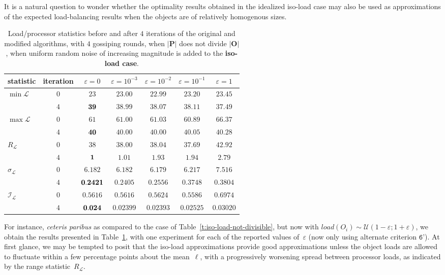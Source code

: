 It is a natural question to wonder whether the optimality results
obtained in the idealized iso-load case may also be used as
approximations of the expected load-balancing results when the objects
are of relatively homogenous sizes.

\begin{table}[htb!]
\begin{center}
\begin{tabular}{lcccccc}
\hline
statistic & iteration
& $\varepsilon=0$
& $\varepsilon=10^{-3}$
& $\varepsilon=10^{-2}$
& $\varepsilon=10^{-1}$
& $\varepsilon=1$ \\
\hline\hline
\multirow{2}{*}{$\min{\mathcal{L}}$}
&$0$ &$23$    &$23.00$ &$22.99$ &$23.20$ &$23.45$ \\
&$4$ &$\bf39$ &$38.99$ &$38.07$ &$38.11$ &$37.49$ \\\hline
\multirow{2}{*}{$\max{\mathcal{L}}$}
&$0$ &$61$    &$61.00$ &$61.03$ &$60.89$ &$66.37$ \\
&$4$ &$\bf40$ &$40.00$ &$40.00$ &$40.05$ &$40.28$ \\\hline
\multirow{2}{*}{$R_{\mathcal{L}}$}
&$0$ &$38$    &$38.00$ &$38.04$ &$37.69$ &$42.92$ \\
&$4$ &$\bf1$  &$1.01$  &$1.93$  &$1.94$  &$2.79$  \\\hline
\multirow{2}{*}{$\sigma_{\mathcal{L}}$}
&$0$ &$6.182$     &$6.182$  &$6.179$  &$6.217$ &$7.516$ \\
&$4$ &$\bf0.2421$ &$0.2405$ &$0.2556$ &$0.3748$ &$0.3804$ \\\hline
\multirow{2}{*}{$\mathcal{I}_\mathcal{L}$}
&$0$ &$0.5616$   &$0.5616$  &$0.5624$  &$0.5586$ &$0.6974$ \\
&$4$ &$\bf0.024$ &$0.02399$ &$0.02393$ &$0.02525$ &$0.03020$ \\\hline
\end{tabular}
\end{center}
\caption{\label{t:iso-load-not-divisible-epsilon-i4}
Load/processor statistics before and after $4$ iterations of the
original and modified algorithms, with $4$ gossiping rounds, when
$\vert\mathbf{P}\vert$ does not divide $\vert\mathbf{O}\vert$, when
uniform random noise of increasing magnitude is added to the
\textbf{iso-load case}.}
\end{table}
For instance, \emph{ceteris paribus} as compared to the case
of Table~\ref{t:iso-load-not-divisible}, but now with 
$load(O_i)\sim\mathcal{U}(1-\varepsilon;1+\varepsilon)$, we obtain the
results presented in Table~\ref{t:iso-load-not-divisible-epsilon-i4},
with one experiment for each of the reported values of~$\varepsilon$
(now only using alternate criterion $\texttt{6'}$).
At first glance, we may be tempted to posit that the iso-load
approximations provide good approximations unless the object loads are
allowed to fluctuate within a few percentage points about the
mean~$\ell$, with a progressively worsening spread between processor
loads, as indicated by the range statistic~$R_{\mathcal{L}}$.

